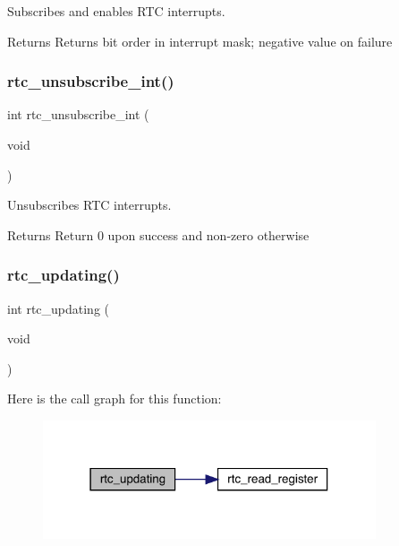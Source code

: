 Subscribes and enables R\+TC interrupts. 

\begin{DoxyReturn}{Returns}
Returns bit order in interrupt mask; negative value on failure 
\end{DoxyReturn}
\hypertarget{group___serial_ga5b1cba4be2c15183b9f2c089fe6e946a}{}\label{group___serial_ga5b1cba4be2c15183b9f2c089fe6e946a} 
\subsubsection{\texorpdfstring{rtc\+\_\+unsubscribe\+\_\+int()}{rtc\_unsubscribe\_int()}}
{\footnotesize\ttfamily int rtc\+\_\+unsubscribe\+\_\+int (\begin{DoxyParamCaption}\item[{void}]{ }\end{DoxyParamCaption})}



Unsubscribes R\+TC interrupts. 

\begin{DoxyReturn}{Returns}
Return 0 upon success and non-\/zero otherwise 
\end{DoxyReturn}
\hypertarget{group___serial_gacaae78073772a1f95560e42cef087a93}{}\label{group___serial_gacaae78073772a1f95560e42cef087a93} 
\subsubsection{\texorpdfstring{rtc\+\_\+updating()}{rtc\_updating()}}
{\footnotesize\ttfamily int rtc\+\_\+updating (\begin{DoxyParamCaption}\item[{void}]{ }\end{DoxyParamCaption})}

Here is the call graph for this function\+:\nopagebreak
\begin{figure}[H]
\begin{center}
\leavevmode
\includegraphics[width=279pt]{group___serial_gacaae78073772a1f95560e42cef087a93_cgraph}
\end{center}
\end{figure}
\hypertarget{group___serial_gab88c07eaefdae0ccbae9e7c2a1e04f71}{}\label{group___serial_gab88c07eaefdae0ccbae9e7c2a1e04f71} 
